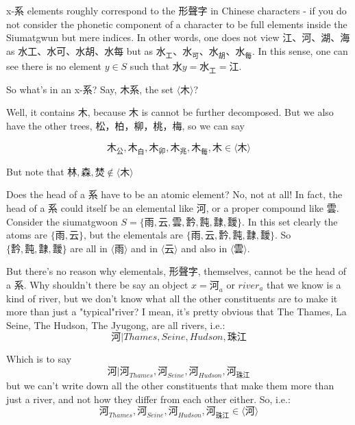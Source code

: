     x-系 elements roughly correspond to the 形聲字 in Chinese characters - if you do not consider the phonetic component of a character to be full elements inside the Siumatgwun but mere indices. In other words, one does not view 江、河、湖、海 as 水工、水可、水胡、水每 but as $\text{水}_\text{工}、\text{水}_\text{可}、\text{水}_\text{胡}、\text{水}_\text{每}$. In this sense, one can see there is no element $y \in S$ such that $\text{水}y=\text{水}_\text{工}=\text{江}$.

        
 So what's in an x-系? Say, 木系, the set $\langle \text{木} \rangle$?

Well, it contains $\text{木}$, because $\text{木}$ is cannot be further decomposed. But we also have the other trees, 松，柏，柳，桃，梅, so we can say 

$$\text{木}_{\text{公}},\text{木}_{\text{白}},\text{木}_{\text{卯}},\text{木}_{\text{兆}},\text{木}_{\text{每}},  \text{木} \in \langle \text{木} \rangle$$



But note that $\text{林}, \text{森},  \text{焚} \not\in \langle \text{木} \rangle$

Does the head of a 系 have to be an atomic element? No, not at all! In fact, the head of a 系 could itself be an elemental like 河, or a proper compound like 雲. Consider the siumatgwoon $S = \{\text{雨}, \text{云}, \text{雲}, \text{霒}, \text{霕}, \text{霴}, \text{靉}\}$. In this set clearly the atoms are $\{\text{雨}, \text{云}\}$, but the elementals are $\{\text{雨}, \text{云}, \text{霒}, \text{霕}, \text{霴}, \text{靉}\}$. So $\{\text{霒}, \text{霕}, \text{霴}, \text{靉}\}$ are all in $\langle \text{雨} \rangle$ and in $\langle \text{云} \rangle$ and also in $\langle \text{雲} \rangle$.

But there's no reason why elementals, 形聲字, themselves, cannot be the head of a 系. Why shouldn't there be say an object $x=\text{河}_{a}$ or $river_{a}$ that we know is a kind of river, but we don't know what all the other constituents are to make it more than just a "typical"river? I mean, it's pretty obvious that The Thames, La Seine, The Hudson, The Jyugong, are all rivers, i.e.: 
$$\text{河} | Thames, Seine, Hudson, \text{珠江}$$

Which is to say 
$$\text{河} |  \text{河}_{Thames},\text{河}_{Seine},\text{河}_{Hudson},\text{河}_{\text{珠江}} $$
but we can't write down all the other constituents that make them more than just a river, and not how they differ from each other either. So, 
i.e.: 
$$\text{河}_{Thames},\text{河}_{Seine},\text{河}_{Hudson},\text{河}_{\text{珠江}} \in \langle \text{河} \rangle$$



